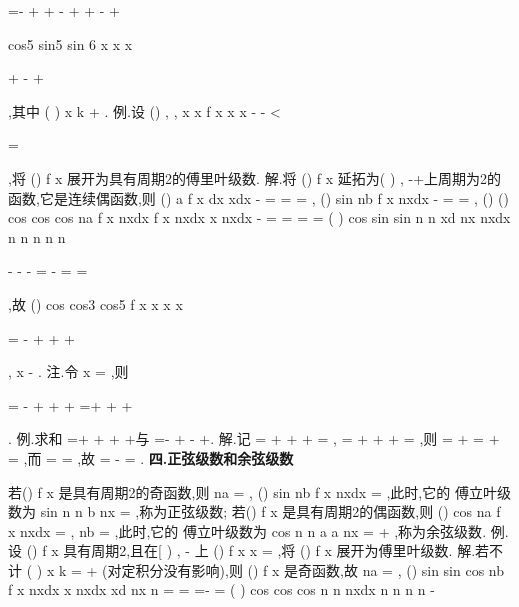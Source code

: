 =-
+
+
-
+
+
-
+








cos5
sin5
sin 6
x
x
x
\pi 


+
-
+




\Lambda ,其中
(
)
x
k
\pi 
\neq 
+
. 
\textcolor{lyred}{例}.设
()
,
,
x
x
f x
x
x
\pi 
\pi 
-
-
\le 
<

=
\le 
\le 

,将
()
f x 展开为具有周期2\pi 的傅里叶级数. 
解.将
()
f x 延拓为(
)
,
-\infty +\infty 上周期为2\pi 的函数,它是连续偶函数,则 
()
a
f x dx
xdx
\pi 
\pi 
\pi 
\pi 
\pi 
\pi 
-
=
=
=
\int 
\int 
,
()
sin
nb
f x
nxdx
\pi 
\pi 
\pi -
=
=
\int 
, 
()
()
cos
cos
cos
na
f x
nxdx
f x
nxdx
x
nxdx
\pi 
\pi 
\pi 
\pi 
\pi 
\pi 
\pi 
-
=
=
=
=
\int 
\int 
\int 
(
)
cos
sin
sin
n
n
xd
nx
nxdx
n
n
n
n
n
\pi 
\pi 
\pi 
\pi 
\pi 
\pi 
\pi 


-
-
-
=
-
=
\cdots 
=
\cdots 




\int 
\int 
,故 
()
cos
cos3
cos5
f x
x
x
x
\pi 
\pi 


=
-
+
+
+




\Lambda ,
x
\pi 
\pi 
-
\le 
\le 
. 
\textcolor{lyred}{注}.令
x =
,则
\pi 
\pi 
\pi 


=
-
+
+
+
\Rightarrow 
=+
+
+




\Lambda 
\Lambda . 
\textcolor{lyred}{例}.求和
\sigma =+
+
+
+\Lambda 与
\tau =-
+
-
+\Lambda . 
解.记
\pi 
\sigma =
+
+
+
=
\Lambda 
,
\sigma 
\sigma 
=
+
+
+
=
\Lambda 
,则 
\pi 
\pi 
\sigma 
\sigma 
\sigma 
\sigma 
\sigma 
=
+
=
+
\Rightarrow 
=
,而
\pi 
\sigma 
\sigma 
=
=
,故 
\pi 
\tau 
\sigma 
\sigma 
=
-
=
. 
\vspace{4pt}
{\bfseries \textcolor{lyred}{四.正弦级数和余弦级数}}

若()
f
x 是具有周期2\pi 的奇函数,则
na =
,
()
sin
nb
f
x
nxdx
\pi 
\pi 
=
\int 
,此时,它的 
傅立叶级数为
sin
n
n
b
nx
\infty 
=\sum 
,称为\textcolor{lyred}{正弦级数}; 
若()
f
x 是具有周期2\pi 的偶函数,则
()
cos
na
f
x
nxdx
\pi 
\pi 
=
\int 
,
nb =
,此时,它的 
傅立叶级数为
cos
n
n
a
a
nx
\infty 
=
+\sum 
,称为\textcolor{lyred}{余弦级数}. 
\textcolor{lyred}{例}.设
()
f x 具有周期2\pi ,且在[
)
,
\pi \pi 
-
上
()
f x
x
=
,将
()
f x 展开为傅里叶级数. 
解.若不计
(
)
x
k
\pi 
=
+
(对定积分没有影响),则
()
f x 是奇函数,故 
na =
,
()
sin
sin
cos
nb
f x
nxdx
x
nxdx
xd
nx
n
\pi 
\pi 
\pi 
\pi 
\pi 
\pi 
=
=
=-
=
\int 
\int 
\int 
(
)
cos
cos
cos
n
n
nxdx
n
n
n
n
\pi 
\pi 
\pi 
\pi 
\pi 
-


